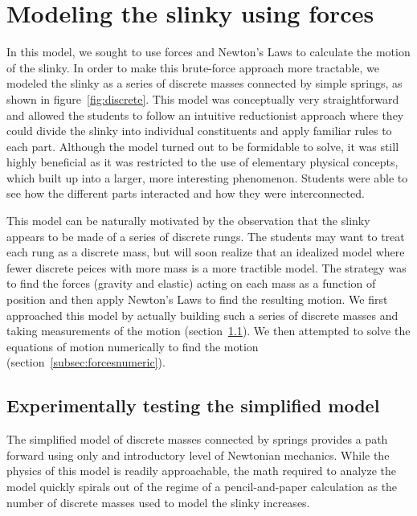 \documentclass[aps,pre,10pt,superscriptaddress,showpacs,amsmath,amssymb,nofootinbib]{revtex4-1}
\newcommand{\subsec}[1]{section~\ref{subsec:#1}}
\newcommand{\fig}[1]{figure~\ref{fig:#1}}
\begin{document}
\section{Modeling the slinky using forces}
\label{sec:forces}

In this model, we sought to use forces and Newton's Laws to calculate the
motion of the slinky. In order to make this brute-force approach more tractable, we
modeled the slinky as a series of discrete masses connected by simple springs, as
shown in \fig{discrete}. This
model was conceptually very straightforward and allowed the students to follow an
intuitive reductionist approach where they could divide the slinky into individual
constituents and apply familiar rules to each part. Although the model turned out to
be formidable to solve, it was still highly beneficial as it was restricted to the
use of elementary physical concepts, which built up into a larger, more interesting
phenomenon. Students were able to see how the different parts interacted and how they
were interconnected.

This model can be naturally motivated
by the observation that the slinky appears to be made of a series of discrete rungs.  The students may want 
to treat each rung as a discrete mass, but will soon realize that an idealized model where fewer discrete peices 
with more mass is a more tractible model.  The strategy  was to find the forces (gravity and elastic) acting on 
each mass as a function of position and then
apply Newton's Laws to find the resulting motion. We first approached this model
by actually building such a series of discrete masses and taking measurements of
the motion (\subsec{forcesexperiment}). We then attempted to solve the equations
of motion numerically to find the motion (\subsec{forcesnumeric}).

\subsection{Experimentally testing the simplified model}
\label{subsec:forcesexperiment}

The simplified model of discrete masses connected by springs provides a path forward using
only and introductory level of Newtonian mechanics.  While the physics of this model 
is readily approachable, the math required to analyze the model quickly spirals out of 
the regime of a pencil-and-paper calculation as the number of discrete masses used to model 
the slinky increases.  

\end{document}
